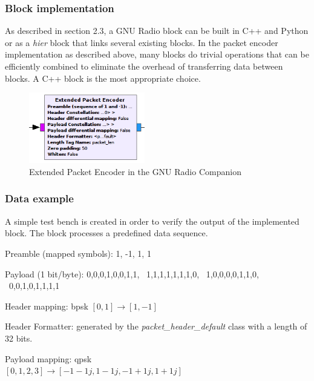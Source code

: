 \subsubsection{Block implementation}
As described in section 2.3, a GNU Radio block can be built in C++ and Python or as a \textit{hier} block that links several existing blocks. In the packet encoder implementation as described above, many blocks do trivial operations that can be efficiently combined to eliminate the overhead of transferring data between blocks. A C++ block is the most appropriate choice.

\begin{figure}[H]
    \centering
    \includegraphics[width=0.45\textwidth]{img_packets/packet_enc_block.png}
    \caption{Extended Packet Encoder in the GNU Radio Companion}
    \label{fig:packet_enc_block}
\end{figure}







\subsubsection{Data example}
A simple test bench is created in order to verify the output of the implemented block. The block processes a predefined data sequence.

\begin{tight_itemize}
\item Preamble (mapped symbols): 1, -1, 1, 1
\item Payload (1 bit/byte): 0,0,0,1,0,0,1,1, \ 1,1,1,1,1,1,1,0, \  1,0,0,0,0,1,1,0, \ 0,0,1,0,1,1,1,1
\item Header mapping: \gls{bpsk} $[0,1] \rightarrow  [1, -1]$
\item Header Formatter: generated by the \textit{packet\_header\_default} class with a length of 32 bits.
\item Payload mapping: \gls{qpsk} \\$[0, 1, 2, 3] \rightarrow[-1-1j, 1-1j, -1+1j, 1+1j]$ 
\end{tight_itemize}

